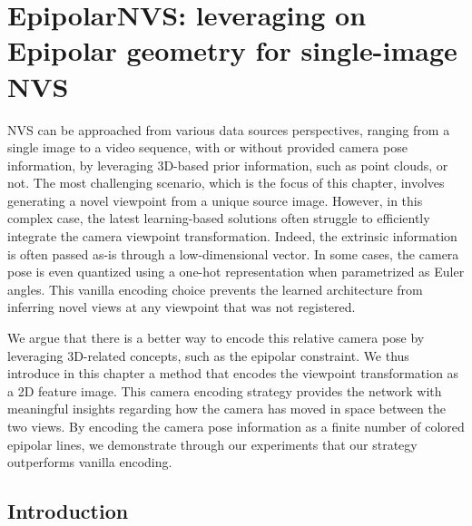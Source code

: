 \chapter{EpipolarNVS: leveraging on Epipolar geometry for single-image NVS} 
\label{chapter:epipolarnvs}


\newcommand{\tableindent}{\,\,\,\,}
\newcommand{\vt}{\mathbf{t}}

\newcommand{\std}{$\pm\,$}
\newcommand{\clf}{\textit{clf}} \newcommand{\gray}[1]{{\color{darkgray}#1}}



\ac{NVS} can be approached from various data sources perspectives, ranging from a single image to a video sequence, with or without provided camera pose information, by leveraging 3D-based prior information, such as point clouds, or not. The most challenging scenario, which is the focus of this chapter, involves generating a novel viewpoint from a unique source image. However, in this complex case, the latest learning-based solutions often struggle to efficiently integrate the camera viewpoint transformation. Indeed, the extrinsic information is often passed as-is through a low-dimensional vector. In some cases, the camera pose is even quantized using a one-hot representation when parametrized as Euler angles. This vanilla encoding choice prevents the learned architecture from inferring novel views at any viewpoint that was not registered. 

We argue that there is a better way to encode this relative camera pose by leveraging 3D-related concepts, such as the epipolar constraint. We thus introduce in this chapter a method that encodes the viewpoint transformation as a 2D feature image. This camera encoding strategy provides the network with meaningful insights regarding how the camera has moved in space between the two views. By encoding the camera pose information as a finite number of colored epipolar lines, we demonstrate through our experiments that our strategy outperforms vanilla encoding. 

\section{Introduction}

